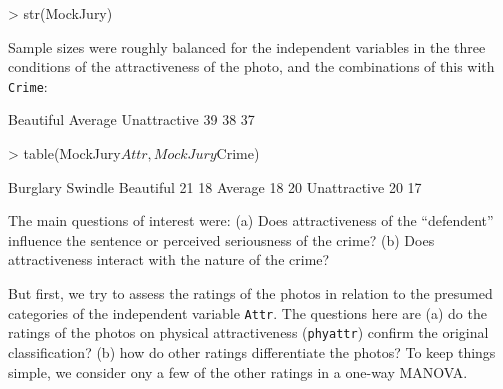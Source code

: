 \documentclass[11pt]{article}
\newcommand{\code}[1]{{\texttt{#1}}}
\begin{document}
\begin{Schunk}
\begin{Sinput}
> str(MockJury)
\end{Sinput}
\end{Schunk}
Sample sizes were roughly balanced  for the independent variables
in the three conditions of the attractiveness of the photo,
and the combinations of this with \code{Crime}:
\begin{Schunk}
\begin{Soutput}
   Beautiful      Average Unattractive 
          39           38           37 
\end{Soutput}
\begin{Sinput}
> table(MockJury$Attr, MockJury$Crime)
\end{Sinput}
\begin{Soutput}
               Burglary Swindle
  Beautiful          21      18
  Average            18      20
  Unattractive       20      17
\end{Soutput}
\end{Schunk}

The main questions of interest were:
(a) Does attractiveness of the ``defendent'' influence the sentence or perceived
seriousness of the crime?  
(b) Does attractiveness interact with the nature of the
crime?

But first, we try to assess the ratings of the photos in relation to the 
presumed categories of the independent variable \code{Attr}.  The questions here
are (a) do the ratings of the photos on physical attractiveness
(\code{phyattr}) confirm the original classification?
(b) how do other ratings differentiate the photos?
To keep things simple, we consider ony a few of the other ratings in a one-way MANOVA.
\end{document}
